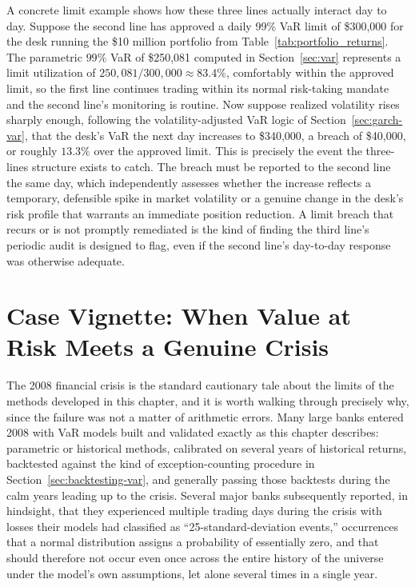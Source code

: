 \documentclass[../ai_in_finance]{subfiles}
\begin{document}
A concrete limit example shows how these three lines actually interact day to day. Suppose the second line has approved a daily 99\% VaR limit of \$300,000 for the desk running the \$10 million portfolio from Table~\ref{tab:portfolio_returns}. The parametric $99\%$ VaR of \$250,081 computed in Section~\ref{sec:var} represents a limit utilization of $250{,}081/300{,}000 \approx 83.4\%$, comfortably within the approved limit, so the first line continues trading within its normal risk-taking mandate and the second line's monitoring is routine.
Now suppose realized volatility rises sharply enough, following the volatility-adjusted VaR logic of Section~\ref{sec:garch-var}, that the desk's VaR the next day increases to \$340,000, a breach of \$40,000, or roughly $13.3\%$ over the approved limit.
This is precisely the event the three-lines structure exists to catch. The breach must be reported to the second line the same day, which independently assesses whether the increase reflects a temporary, defensible spike in market volatility or a genuine change in the desk's risk profile that warrants an immediate position reduction. A limit breach that recurs or is not promptly remediated is the kind of finding the third line's periodic audit is designed to flag, even if the second line's day-to-day response was otherwise adequate.

\section{Case Vignette: When Value at Risk Meets a Genuine Crisis}

The 2008 financial crisis is the standard cautionary tale about the limits of the methods developed in this chapter, and it is worth walking through precisely why, since the failure was not a matter of arithmetic errors. Many large banks entered 2008 with VaR models built and validated exactly as this chapter describes: parametric or historical methods, calibrated on several years of historical returns, backtested against the kind of exception-counting procedure in Section~\ref{sec:backtesting-var}, and generally passing those backtests during the calm years leading up to the crisis.
Several major banks subsequently reported, in hindsight, that they experienced multiple trading days during the crisis with losses their models had classified as ``25-standard-deviation events,'' occurrences that a normal distribution assigns a probability of essentially zero, and that should therefore not occur even once across the entire history of the universe under the model's own assumptions, let alone several times in a single year.
\end{document}
